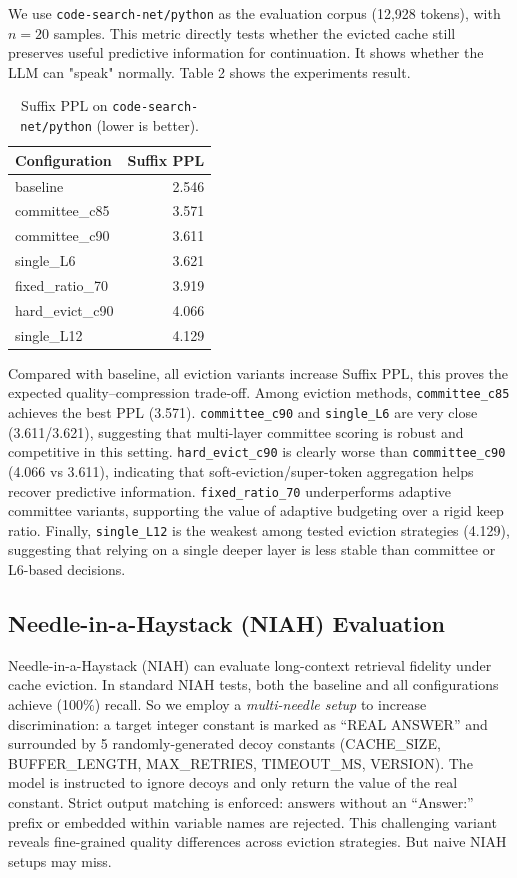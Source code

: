 \documentclass[letterpaper]{article} %
\begin{document}
We use \texttt{code-search-net/python} as the evaluation corpus (12,928 tokens), with
$n=20$ samples. This metric directly tests whether the evicted cache still preserves
useful predictive information for continuation. It shows whether the LLM can "speak" normally.
Table 2 shows the experiments result.

\begin{table}[t]
\centering
\small
\caption{Suffix PPL on \texttt{code-search-net/python} (lower is better).}
\label{tab:suffix_ppl}
\begin{tabular}{lr}
\toprule
Configuration & Suffix PPL \\
\midrule
baseline          & 2.546 \\
committee\_c85    & 3.571 \\
committee\_c90    & 3.611 \\
single\_L6        & 3.621 \\
fixed\_ratio\_70  & 3.919 \\
hard\_evict\_c90  & 4.066 \\
single\_L12       & 4.129 \\
\bottomrule
\end{tabular}
\end{table}

Compared with baseline, all eviction variants increase Suffix PPL, this proves the expected
quality--compression trade-off.
Among eviction methods, \texttt{committee\_c85} achieves the best PPL (3.571).
\texttt{committee\_c90} and \texttt{single\_L6} are very close (3.611/3.621), suggesting
that multi-layer committee scoring is robust and competitive in this setting.
\texttt{hard\_evict\_c90} is clearly worse than \texttt{committee\_c90} (4.066 vs 3.611),
indicating that soft-eviction/super-token aggregation helps recover predictive information.
\texttt{fixed\_ratio\_70} underperforms adaptive committee variants, supporting the value of
adaptive budgeting over a rigid keep ratio.
Finally, \texttt{single\_L12} is the weakest among tested eviction strategies (4.129),
suggesting that relying on a single deeper layer is less stable than committee or L6-based decisions.

\subsection{Needle-in-a-Haystack (NIAH) Evaluation}
\label{sec:exp_niah}

Needle-in-a-Haystack (NIAH) can evaluate long-context retrieval fidelity under cache eviction.
In standard NIAH tests, both the baseline and all configurations achieve (100\%) recall.
So we employ a \emph{multi-needle setup} to increase discrimination: a target integer constant is
marked as ``REAL ANSWER'' and surrounded by 5 randomly-generated decoy constants
(CACHE\_SIZE, BUFFER\_LENGTH, MAX\_RETRIES, TIMEOUT\_MS, VERSION).
The model is instructed to ignore decoys and only return the value of the 
real constant. Strict output matching is enforced: answers without an ``Answer:'' 
prefix or embedded within variable names are rejected.
This challenging variant reveals fine-grained quality differences across eviction strategies.
But naive NIAH setups may miss.
\end{document}
